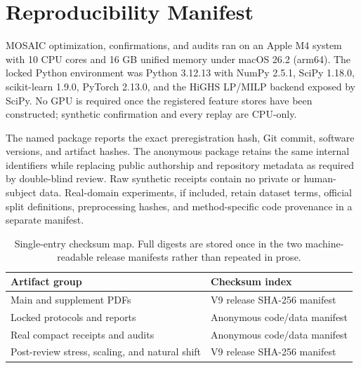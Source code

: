 









\section{Reproducibility Manifest}

MOSAIC optimization, confirmations, and audits ran on an Apple M4 system with
10 CPU cores and 16 GB unified memory under macOS 26.2 (arm64). The locked
Python environment was Python 3.12.13 with NumPy 2.5.1, SciPy 1.18.0,
scikit-learn 1.9.0, PyTorch 2.13.0, and the HiGHS LP/MILP backend exposed by
SciPy. No GPU is
required once the registered feature stores have been constructed; synthetic
confirmation and every replay are CPU-only.

The named package reports the exact preregistration hash, Git commit, software
versions, and artifact hashes. The anonymous package retains the same internal
identifiers while replacing public authorship and repository metadata as
required by double-blind review. Raw synthetic receipts contain no private or
human-subject data. Real-domain experiments, if included, retain dataset terms,
official split definitions, preprocessing hashes, and method-specific code
provenance in a separate manifest.

\begin{table}[t]
\centering
\scriptsize
\setlength{\tabcolsep}{2.5pt}
\begin{tabular}{ll}
\hline
Artifact group & Checksum index \\
\hline
Main and supplement PDFs & V9 release SHA-256 manifest \\
Locked protocols and reports & Anonymous code/data manifest \\
Real compact receipts and audits & Anonymous code/data manifest \\
Post-review stress, scaling, and natural shift & V9 release SHA-256 manifest \\
\hline
\end{tabular}
\caption{Single-entry checksum map. Full digests are stored once in the two
machine-readable release manifests rather than repeated in prose.}
\label{supp:tab:checksum-map}
\end{table}

